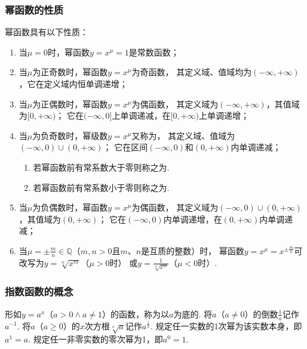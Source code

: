 \subsubsection{幂函数的性质}
\begin{property}
幂函数具有以下性质：
\begin{enumerate}
\item 当\(\mu = 0\)时，幂函数\(y=x^{\mu}=1\)是常数函数；

\item 当\(\mu\)为正奇数时，幂函数\(y=x^{\mu}\)为奇函数，%
其定义域、值域均为\((-\infty,+\infty)\)，它在定义域内恒单调递增；

\item 当\(\mu\)为正偶数时，幂函数\(y=x^{\mu}\)为偶函数，%
其定义域为\((-\infty,+\infty)\)，其值域为\([0,+\infty)\)；
它在\((-\infty,0]\)上单调递减，在\([0,+\infty)\)上单调递增；

\item 当\(\mu\)为负奇数时，幂级数\(y=x^{\mu}\)又称为，%
其定义域、值域为\((-\infty,0)\cup(0,+\infty)\)；
它在区间\((-\infty,0)\)和\((0,+\infty)\)内单调递减；
\begin{enumerate}
	\item 若幂函数前有常系数大于零则称之为.
	\item 若幂函数前有常系数小于零则称之为.
\end{enumerate}

\item 当\(\mu\)为负偶数时，幂函数\(y=x^{\mu}\)为偶函数，%
其定义域为\((-\infty,0)\cup(0,+\infty)\)，其值域为\((0,+\infty)\)；
它在\((-\infty,0)\)内单调递增，在\((0,+\infty)\)内单调递减；

\item 当\(\mu = \pm\frac{m}{n} \in \mathbb{Q}\)（\(m,n>0\)且\(m\)、\(n\)是互质的整数）时，%
幂函数\(y=x^{\mu}=x^{\pm\frac{m}{n}}\)可改写为\(y=\sqrt[n]{x^m}\)（\(\mu>0\)时）%
或\(y=\frac{1}{\sqrt[n]{x^m}}\)（\(\mu<0\)时）.
\end{enumerate}
\end{property}

\subsubsection{指数函数的概念}
\begin{definition}[指数函数]
形如\(y=a^x\)（\(a>0 \land a \neq 1\)）的函数，称为以\(a\)为底的.
将\(a\)（\(a \neq 0\)）的倒数\(\frac{1}{a}\)记作\(a^{-1}\).
将\(a\)（\(a \geq 0\)）的\(x\)次方根\(\sqrt[x]{a}\)记作\(a^{\frac{1}{x}}\).
规定任一实数的1次幂为该实数本身，即\(a^1=a\).
规定任一非零实数的零次幂为1，即\(a^0=1\).
\end{definition}

